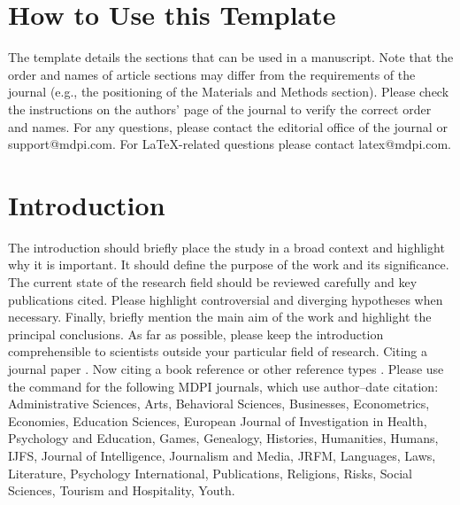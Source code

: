 \documentclass[journal,article,submit,pdftex,moreauthors]{Definitions/mdpi}
\begin{document}
\setcounter{section}{-1} %
\section{How to Use this Template}

The template details the sections that can be used in a manuscript. Note that the order and names of article sections may differ from the requirements of the journal (e.g., the positioning of the Materials and Methods section). Please check the instructions on the authors' page of the journal to verify the correct order and names. For any questions, please contact the editorial office of the journal or support@mdpi.com. For LaTeX-related questions please contact latex@mdpi.com.%


\section{Introduction}

The introduction should briefly place the study in a broad context and highlight why it is important. It should define the purpose of the work and its significance. The current state of the research field should be reviewed carefully and key publications cited. Please highlight controversial and diverging hypotheses when necessary. Finally, briefly mention the main aim of the work and highlight the principal conclusions. As far as possible, please keep the introduction comprehensible to scientists outside your particular field of research. Citing a journal paper \citep{ref-journal}.  Now citing a book reference \citep{ref-book1,ref-book2} or other reference types \citep{ref-unpublish,ref-url}. Please use the command \citep{ref-proceeding,ref-thesis} for the following MDPI journals, which use author--date citation: Administrative Sciences, Arts, Behavioral Sciences, Businesses, Econometrics, Economies, Education Sciences, European Journal of Investigation in Health, Psychology and Education, Games, Genealogy, Histories, Humanities, Humans, IJFS, Journal of Intelligence, Journalism and Media, JRFM, Languages, Laws, Literature, Psychology International, Publications, Religions, Risks, Social Sciences, Tourism and Hospitality, Youth. 
\end{document}
